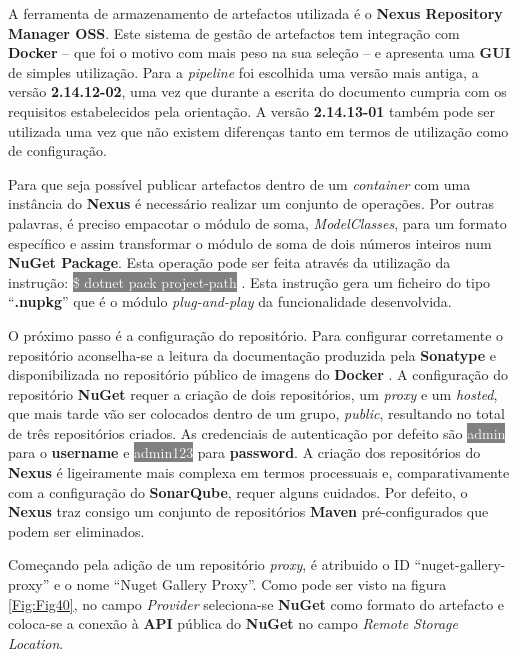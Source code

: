 \hspace{1cm}A ferramenta de armazenamento de artefactos utilizada é o \textbf{Nexus Repository Manager OSS}. Este sistema de gestão de artefactos tem integração com \textbf{Docker} -- que foi o motivo com mais peso na sua seleção -- e apresenta uma \textbf{GUI} de simples utilização. Para a \textit{pipeline} foi escolhida uma versão mais antiga, a versão \textbf{2.14.12-02}, uma vez que durante a escrita do documento cumpria com os requisitos estabelecidos pela orientação. A versão \textbf{2.14.13-01} também pode ser utilizada uma vez que não existem diferenças tanto em termos de utilização como de configuração.

\hspace{1cm}Para que seja possível publicar artefactos dentro de um \textit{container} com uma instância do \textbf{Nexus} é necessário realizar um conjunto de operações. Por outras palavras, é preciso empacotar o módulo de soma, \textit{ModelClasses}, para um formato específico e assim transformar o módulo de soma de dois números inteiros num \textbf{NuGet Package}. Esta operação pode ser feita através da utilização da instrução: \colorbox{gray}{\textcolor{white}{\$ dotnet pack project-path}} \cite{dotnetpack}. Esta instrução gera um ficheiro do tipo ``\textbf{.nupkg}'' que é o módulo \textit{plug-and-play} da funcionalidade desenvolvida.

\hspace{1cm}O próximo passo é a configuração do repositório. Para configurar corretamente o repositório aconselha-se a leitura da documentação produzida pela \textbf{Sonatype} \textbf{\cite{sonatypenexus}} e disponibilizada no repositório público de imagens do \textbf{Docker} \textbf{\cite{sonatypenexusdocker}}. A configuração do repositório \textbf{NuGet} requer a criação de dois repositórios, um \textit{proxy} e um \textit{hosted}, que mais tarde vão ser colocados dentro de um grupo, \textit{public}, resultando no total de três repositórios criados. As credenciais de autenticação por defeito são \colorbox{gray}{\textcolor{white}{admin}} para o \textbf{username} e \colorbox{gray}{\textcolor{white}{admin123}} para \textbf{password}. A criação dos repositórios do \textbf{Nexus} é ligeiramente mais complexa em termos processuais e, comparativamente com a configuração do \textbf{SonarQube}, requer alguns cuidados. Por defeito, o \textbf{Nexus} traz consigo um conjunto de repositórios \textbf{Maven} pré-configurados que podem ser eliminados. 

\hspace{1cm}Começando pela adição de um repositório \textit{proxy}, é atribuido o ID ``nuget-gallery-proxy'' e o nome ``Nuget Gallery Proxy''. Como pode ser visto na figura \ref{Fig:Fig40}, no campo \textit{Provider} seleciona-se \textbf{NuGet} como formato do artefacto e coloca-se a conexão à \textbf{API} pública do \textbf{NuGet} no campo \textit{Remote Storage Location}.

